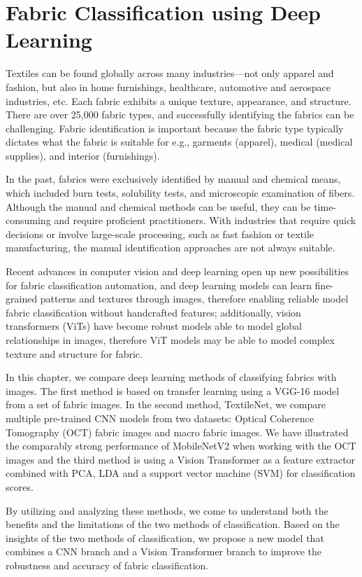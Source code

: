 \chapter{Fabric Classification using Deep Learning}

Textiles can be found globally across many industries—not only apparel and fashion, but also in home furnishings, healthcare, automotive and aerospace industries, etc. Each fabric exhibits a unique texture, appearance, and structure. There are over 25,000 fabric types, and successfully identifying the fabrics can be challenging. Fabric identification is important because the fabric type typically dictates what the fabric is suitable for e.g., garments (apparel), medical (medical supplies), and interior (furnishings). 

In the past, fabrics were exclusively identified by manual and chemical means, which included burn tests, solubility tests, and microscopic examination of fibers. Although the manual and chemical methods can be useful, they can be time-consuming and require proficient practitioners. With industries that require quick decisions or involve large-scale processing, such as fast fashion or textile manufacturing, the manual identification approaches are not always suitable.

Recent advances in computer vision and deep learning open up new possibilities for fabric classification automation, and deep learning models can learn fine-grained patterns and textures through images, therefore enabling reliable model fabric classification without handcrafted features; additionally, vision transformers (ViTs) have become robust models able to model global relationships in images, therefore ViT models may be able to model complex texture and structure for fabric. 

In this chapter, we compare deep learning methods of classifying fabrics with images. The first method is based on transfer learning using a VGG-16 model from a set of fabric images. In the second method, TextileNet, we compare multiple pre-trained CNN models from two datasets: Optical Coherence Tomography (OCT) fabric images and macro fabric images. We have illustrated the comparably strong performance of MobileNetV2 when working with the OCT images and the third method is using a Vision Transformer as a feature extractor combined with PCA, LDA and a support vector machine (SVM) for classification scores.

By utilizing and analyzing these methods, we come to understand both the benefits and the limitations of the two methods of classification. Based on the insights of the two methods of classification, we propose a new model that combines a CNN branch and a Vision Transformer branch to improve the robustness and accuracy of fabric classification.

